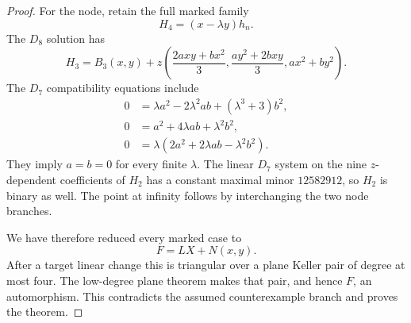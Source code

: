 \begin{proof}
For the node, retain the full marked family
\[
 H_4=(x-\lambda y)h_n.
\]
The $D_8$ solution has
\[
H_3=B_3(x,y)+z\left(
 \frac{2a xy+b x^2}{3},
 \frac{a y^2+2bxy}{3},
 a x^2+b y^2
\right).
\]
The $D_7$ compatibility equations include
\[
\begin{aligned}
0&=\lambda a^2-2\lambda^2ab+(\lambda^3+3)b^2,\\
0&=a^2+4\lambda ab+\lambda^2b^2,\\
0&=\lambda(2a^2+2\lambda ab-\lambda^2b^2).
\end{aligned}
\]
They imply $a=b=0$ for every finite $\lambda$.  The linear $D_7$ system on
the nine $z$-dependent coefficients of $H_2$ has a constant maximal minor
$12582912$, so $H_2$ is binary as well.  The point at infinity follows by
interchanging the two node branches.

We have therefore reduced every marked case to
\[
 F=LX+N(x,y).
\]
After a target linear change this is triangular over a plane Keller pair of
degree at most four.  The low-degree plane theorem makes that pair, and
hence $F$, an automorphism.  This contradicts the assumed counterexample
branch and proves the theorem.
\end{proof}
